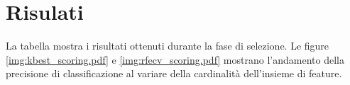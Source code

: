 \section{Risulati}


La tabella \cite{table:feature_selection_table} mostra i risultati ottenuti durante la fase di selezione. Le figure \ref{img:kbest_scoring.pdf} e \ref{img:rfecv_scoring.pdf} mostrano l'andamento della precisione di classificazione al variare della cardinalità dell'insieme di feature.